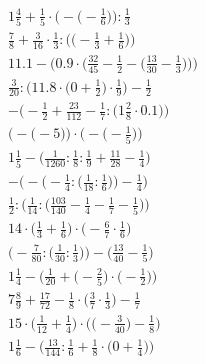 \documentclass[8pt]{article}
\begin{document}
\begin{align}
1\frac{4}{5} + \frac{1}{5} \cdot \Big(-\big(-\frac{1}{6}\big)\Big) : \frac{1}{3} \\
\frac{7}{8} + \frac{3}{16} \cdot \frac{1}{3} : \Big(\big(-\frac{1}{3} + \frac{1}{6}\big)\Big) \\
11.1 - \bigg(0.9 \cdot \Big(\frac{32}{45} - \frac{1}{2} - \big(\frac{13}{30} - \frac{1}{3}\big)\Big)\bigg) \\
\frac{3}{20} : \Big(11.8 \cdot \big(0 + \frac{1}{2}\big) \cdot \frac{1}{9}\Big) - \frac{1}{2} \\
-\Big(-\frac{1}{2} + \frac{23}{112} - \frac{1}{7} : \big(1\frac{2}{8} \cdot 0.1\big)\Big) \\
\Big(-\big(-5\big)\Big) \cdot \Big(-\big(-\frac{1}{5}\big)\Big) \\
1\frac{1}{5} - \big(\frac{1}{1260} : \frac{1}{8} : \frac{1}{9} + \frac{11}{28} - \frac{1}{4}\big) \\
-\bigg(-\Big(-\frac{1}{4} : \big(\frac{1}{18} : \frac{1}{6}\big)\Big) - \frac{1}{4}\bigg) \\
\frac{1}{2} : \Big(\frac{1}{14} : \big(\frac{103}{140} - \frac{1}{4} - \frac{1}{7} - \frac{1}{5}\big)\Big) \\
14 \cdot \big(\frac{1}{3} + \frac{1}{6}\big) \cdot \big(-\frac{6}{7} \cdot \frac{1}{6}\big) \\
\Big(-\frac{7}{80} : \big(\frac{1}{30} : \frac{1}{3}\big)\Big) - \Big(\frac{13}{40} - \frac{1}{5}\Big) \\
1\frac{1}{4} - \Big(\frac{1}{20} + \big(-\frac{2}{5}\big) \cdot \big(-\frac{1}{2}\big)\Big) \\
7\frac{8}{9} + \frac{17}{72} - \frac{1}{8} \cdot \big(\frac{3}{7} \cdot \frac{1}{3}\big) - \frac{1}{7} \\
15 \cdot \Big(\frac{1}{12} + \frac{1}{4}\Big) \cdot \Big(\big(-\frac{3}{40}\big) - \frac{1}{8}\Big) \\
1\frac{1}{6} - \Big(\frac{13}{144} : \frac{1}{6} + \frac{1}{8} \cdot \big(0 + \frac{1}{4}\big)\Big)
\end{align}
\end{document}
